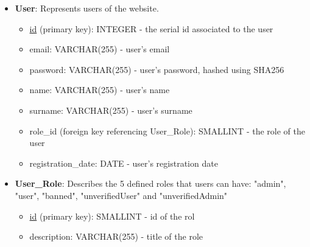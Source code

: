 \begin{itemize}
    \item \textbf{User}: Represents users of the website.
    \begin{itemize}
        \item \underline{id} (primary key): INTEGER - the serial id associated to the user
        \item email: VARCHAR(255) - user's email
        \item password: VARCHAR(255) - user's password, hashed using SHA256
        \item name: VARCHAR(255) - user's name
        \item surname: VARCHAR(255) - user's surname
        \item role\_id (foreign key referencing User\_Role): SMALLINT - the role of the user
        \item registration\_date: DATE - user's registration date
    \end{itemize}
    
    \item \textbf{User\_Role}: Describes the 5 defined roles that users can have: "admin", "user", "banned", "unverifiedUser" and "unverifiedAdmin"
    \begin{itemize}
        \item \underline{id} (primary key): SMALLINT - id of the rol
        \item description: VARCHAR(255) - title of the role
    \end{itemize}
    

\end{itemize}
